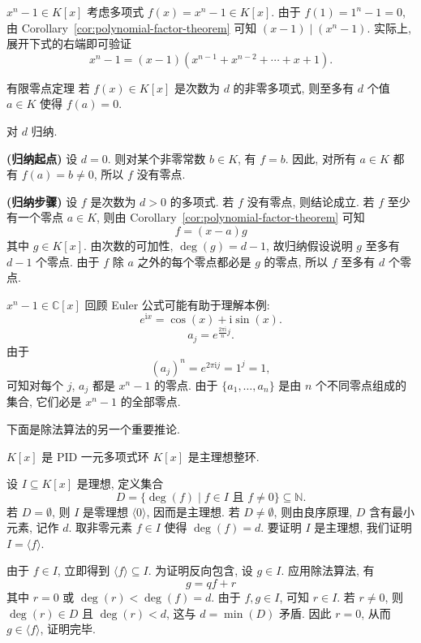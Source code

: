 \begin{Example}{{\textmd{$x^{n}-1\in K[x]$}}}\label{ex:power-minus-one-factor}
  考虑多项式 $f(x)=x^{n}-1\in K[x]$. 由于 $f(1)=1^{n}-1=0$, 由 Corollary~\ref{cor:polynomial-factor-theorem} 可知 $(x-1)\mid(x^{n}-1)$. 实际上, 展开下式的右端即可验证
  \[
    x^{n}-1=(x-1)(x^{n-1}+x^{n-2}+\cdots+x+1).
  \]
\end{Example}

\begin{Corollary}{有限零点定理}\label{cor:polynomial-finite-zeros}
  若 $f(x)\in K[x]$ 是次数为 $d$ 的非零多项式, 则至多有 $d$ 个值 $a\in K$ 使得 $f(a)=0$.
\end{Corollary}

\begin{Proof}
  对 $d$ 归纳.

  \textbf{(归纳起点)} 设 $d=0$. 则对某个非零常数 $b\in K$, 有 $f=b$. 因此, 对所有 $a\in K$ 都有 $f(a)=b\ne0$, 所以 $f$ 没有零点.

  \textbf{(归纳步骤)} 设 $f$ 是次数为 $d>0$ 的多项式. 若 $f$ 没有零点, 则结论成立. 若 $f$ 至少有一个零点 $a\in K$, 则由 Corollary~\ref{cor:polynomial-factor-theorem} 可知
  \[
    f=(x-a)g
  \]
  其中 $g\in K[x]$. 由次数的可加性, $\deg(g)=d-1$, 故归纳假设说明 $g$ 至多有 $d-1$ 个零点. 由于 $f$ 除 $a$ 之外的每个零点都必是 $g$ 的零点, 所以 $f$ 至多有 $d$ 个零点.
\end{Proof}

\begin{Example}{{\textmd{$x^{n}-1\in\mathbb{C}[x]$}}}\label{ex:complex-roots-of-unity}
    {回顾 Euler 公式可能有助于理解本例:
    \[
      e^{\mathrm{i}x}=\cos(x)+\mathrm{i}\sin(x).
    \]}
  \[
    a_{j}=e^{\frac{2\pi\mathrm{i}}{n}j}.
  \]
  由于
  \[
    (a_{j})^{n}=e^{2\pi\mathrm{i}j}=1^{j}=1,
  \]
  可知对每个 $j$, $a_{j}$ 都是 $x^{n}-1$ 的零点. 由于 $\{a_{1},\ldots,a_{n}\}$ 是由 $n$ 个不同零点组成的集合, 它们必是 $x^{n}-1$ 的全部零点.
\end{Example}

下面是除法算法的另一个重要推论.

\begin{Corollary}{{\textmd{$K[x]$} 是 PID}}\label{cor:univariate-polynomial-ring-pid}
  一元多项式环 $K[x]$ 是主理想整环.
\end{Corollary}

\begin{Proof}
  设 $I\subseteq K[x]$ 是理想, 定义集合
  \[
    D=\{\deg(f)\mid f\in I\text{ 且 }f\ne0\}\subseteq\mathbb{N}.
  \]
  若 $D=\emptyset$, 则 $I$ 是零理想 $\langle0\rangle$, 因而是主理想. 若 $D\ne\emptyset$, 则由良序原理, $D$ 含有最小元素, 记作 $d$. 取非零元素 $f\in I$ 使得 $\deg(f)=d$. 要证明 $I$ 是主理想, 我们证明 $I=\langle f\rangle$.

  由于 $f\in I$, 立即得到 $\langle f\rangle\subseteq I$. 为证明反向包含, 设 $g\in I$. 应用除法算法, 有
  \[
    g=qf+r
  \]
  其中 $r=0$ 或 $\deg(r)<\deg(f)=d$. 由于 $f,g\in I$, 可知 $r\in I$. 若 $r\ne0$, 则 $\deg(r)\in D$ 且 $\deg(r)<d$, 这与 $d=\min(D)$ 矛盾. 因此 $r=0$, 从而 $g\in\langle f\rangle$, 证明完毕.
\end{Proof}

